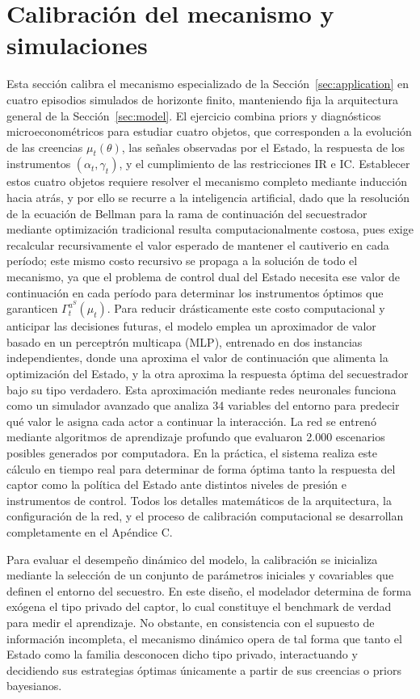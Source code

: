 \documentclass[pdflatex,sn-mathphys-ay]{sn-jnl}
\theoremstyle{thmstyleone}
\theoremstyle{thmstyletwo}
\theoremstyle{thmstylethree}
\newcommand{\1}{\mathbf{1}}
\begin{document}
\section{Calibración del mecanismo y simulaciones}\label{sec:calibracion}
\normalfont\normalsize
Esta sección calibra el mecanismo especializado de la Sección~\ref{sec:application} en cuatro episodios simulados de horizonte finito, manteniendo fija la arquitectura general de la Sección~\ref{sec:model}. El ejercicio combina priors y diagnósticos microeconométricos para estudiar cuatro objetos, que corresponden a la evolución de las creencias $\mu_t(\theta)$, las señales observadas por el Estado, la respuesta de los instrumentos $(\alpha_t,\gamma_t)$, y el cumplimiento de las restricciones IR e IC. Establecer estos cuatro objetos requiere resolver el mecanismo completo mediante inducción hacia atrás, y por ello se recurre a la inteligencia artificial, dado que la resolución de la ecuación de Bellman para la rama de continuación del secuestrador mediante optimización tradicional resulta computacionalmente costosa, pues exige recalcular recursivamente el valor esperado de mantener el cautiverio en cada período; este mismo costo recursivo se propaga a la solución de todo el mecanismo, ya que el problema de control dual del Estado necesita ese valor de continuación en cada período para determinar los instrumentos óptimos que garanticen $\Gamma_t^{a^S}(\mu_t)$. Para reducir drásticamente este costo computacional y anticipar las decisiones futuras, el modelo emplea un aproximador de valor basado en un perceptrón multicapa (MLP), entrenado en dos instancias independientes, donde una aproxima el valor de continuación que alimenta la optimización del Estado, y la otra aproxima la respuesta óptima del secuestrador bajo su tipo verdadero. Esta aproximación mediante redes neuronales funciona como un simulador avanzado que analiza 34 variables del entorno para predecir qué valor le asigna cada actor a continuar la interacción. La red se entrenó mediante algoritmos de aprendizaje profundo que evaluaron 2.000 escenarios posibles generados por computadora. En la práctica, el sistema realiza este cálculo en tiempo real para determinar de forma óptima tanto la respuesta del captor como la política del Estado ante distintos niveles de presión e instrumentos de control. Todos los detalles matemáticos de la arquitectura, la configuración de la red, y el proceso de calibración computacional se desarrollan completamente en el Apéndice C.

Para evaluar el desempeño dinámico del modelo, la calibración se inicializa mediante la selección de un conjunto de parámetros iniciales y covariables que definen el entorno del secuestro. En este diseño, el modelador determina de forma exógena el tipo privado del captor, lo cual constituye el benchmark de verdad para medir el aprendizaje. No obstante, en consistencia con el supuesto de información incompleta, el mecanismo dinámico opera de tal forma que tanto el Estado como la familia desconocen dicho tipo privado, interactuando y decidiendo sus estrategias óptimas únicamente a partir de sus creencias o priors bayesianos.
\end{document}
